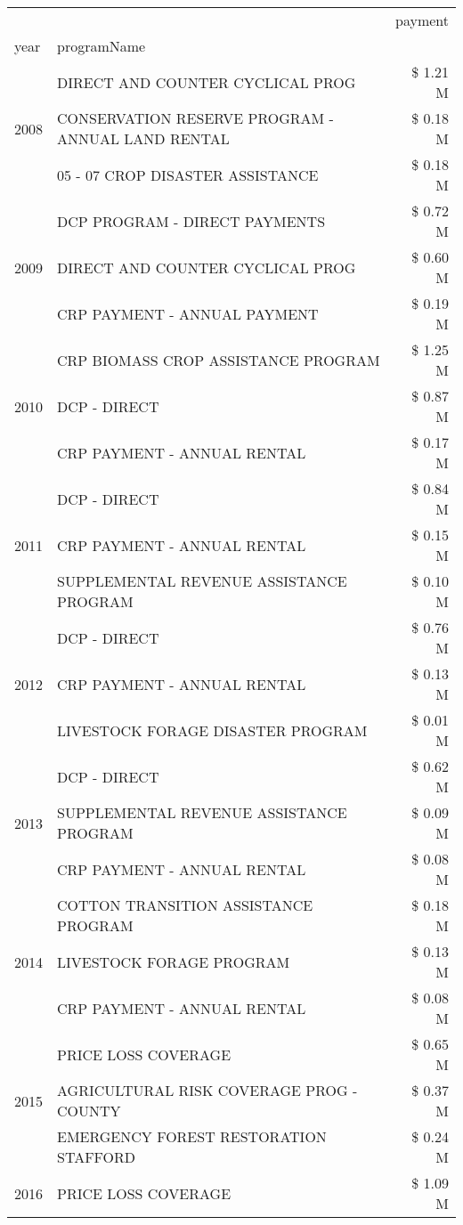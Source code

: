 \begin{tabular}{llr}
\toprule
 &  & payment \\
year & programName &  \\
\midrule
\multirow[t]{3}{*}{2008} & DIRECT AND COUNTER CYCLICAL PROG & \$ 1.21 M \\
 & CONSERVATION RESERVE PROGRAM - ANNUAL LAND RENTAL & \$ 0.18 M \\
 & 05 - 07 CROP DISASTER ASSISTANCE & \$ 0.18 M \\
\cline{1-3}
\multirow[t]{3}{*}{2009} & DCP PROGRAM - DIRECT PAYMENTS & \$ 0.72 M \\
 & DIRECT AND COUNTER CYCLICAL PROG & \$ 0.60 M \\
 & CRP PAYMENT - ANNUAL PAYMENT & \$ 0.19 M \\
\cline{1-3}
\multirow[t]{3}{*}{2010} & CRP BIOMASS CROP ASSISTANCE PROGRAM & \$ 1.25 M \\
 & DCP - DIRECT & \$ 0.87 M \\
 & CRP PAYMENT - ANNUAL RENTAL & \$ 0.17 M \\
\cline{1-3}
\multirow[t]{3}{*}{2011} & DCP - DIRECT & \$ 0.84 M \\
 & CRP PAYMENT - ANNUAL RENTAL & \$ 0.15 M \\
 & SUPPLEMENTAL REVENUE ASSISTANCE PROGRAM & \$ 0.10 M \\
\cline{1-3}
\multirow[t]{3}{*}{2012} & DCP - DIRECT & \$ 0.76 M \\
 & CRP PAYMENT - ANNUAL RENTAL & \$ 0.13 M \\
 & LIVESTOCK FORAGE DISASTER PROGRAM & \$ 0.01 M \\
\cline{1-3}
\multirow[t]{3}{*}{2013} & DCP - DIRECT & \$ 0.62 M \\
 & SUPPLEMENTAL REVENUE ASSISTANCE PROGRAM & \$ 0.09 M \\
 & CRP PAYMENT - ANNUAL RENTAL & \$ 0.08 M \\
\cline{1-3}
\multirow[t]{3}{*}{2014} & COTTON TRANSITION ASSISTANCE PROGRAM & \$ 0.18 M \\
 & LIVESTOCK FORAGE PROGRAM & \$ 0.13 M \\
 & CRP PAYMENT - ANNUAL RENTAL & \$ 0.08 M \\
\cline{1-3}
\multirow[t]{3}{*}{2015} & PRICE LOSS COVERAGE & \$ 0.65 M \\
 & AGRICULTURAL RISK COVERAGE PROG - COUNTY & \$ 0.37 M \\
 & EMERGENCY FOREST RESTORATION STAFFORD & \$ 0.24 M \\
\cline{1-3}
\multirow[t]{3}{*}{2016} & PRICE LOSS COVERAGE & \$ 1.09 M \\

\end{tabular}
